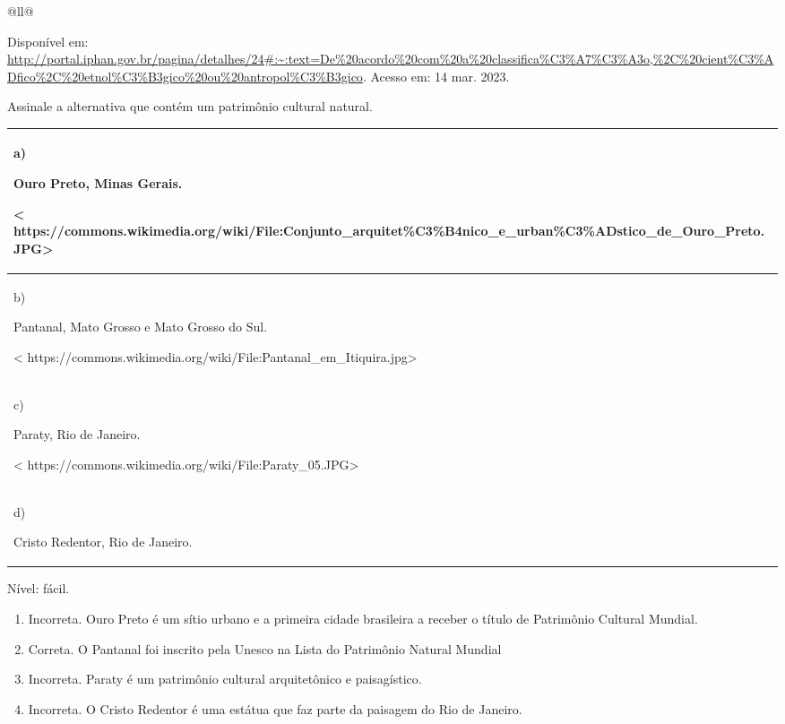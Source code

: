 \begin{itemize}
\begin{itemize}
\begin{escolha}[]{@{}ll@{}}
{{{{{{{{Disponível em:
\url{http://portal.iphan.gov.br/pagina/detalhes/24\#:~:text=De\%20acordo\%20com\%20a\%20classifica\%C3\%A7\%C3\%A3o,\%2C\%20cient\%C3\%ADfico\%2C\%20etnol\%C3\%B3gico\%20ou\%20antropol\%C3\%B3gico}.
Acesso em: 14 mar. 2023.

Assinale a alternativa que contém um patrimônio cultural natural.

\begin{longtable}[]{@{}l@{}}
\toprule
\begin{minipage}[b]{0.97\columnwidth}\raggedright\strut
a)

Ouro Preto, Minas Gerais.

\textless{}
https://commons.wikimedia.org/wiki/File:Conjunto\_arquitet\%C3\%B4nico\_e\_urban\%C3\%ADstico\_de\_Ouro\_Preto.JPG\textgreater{}\strut
\end{minipage}\tabularnewline
\midrule
\endhead
\begin{minipage}[t]{0.97\columnwidth}\raggedright\strut
b)

Pantanal, Mato Grosso e Mato Grosso do Sul.

\textless{}
https://commons.wikimedia.org/wiki/File:Pantanal\_em\_Itiquira.jpg\textgreater{}\strut
\end{minipage}\tabularnewline
\begin{minipage}[t]{0.97\columnwidth}\raggedright\strut
c)

Paraty, Rio de Janeiro.

\textless{}
https://commons.wikimedia.org/wiki/File:Paraty\_05.JPG\textgreater{}\strut
\end{minipage}\tabularnewline
\begin{minipage}[t]{0.97\columnwidth}\raggedright\strut
d)

Cristo Redentor, Rio de Janeiro.\strut
\end{minipage}\tabularnewline
\bottomrule
\end{longtable}

Nível: fácil.

\begin{enumerate}
\def\labelenumi{\alph{enumi})}
\item
  Incorreta. Ouro Preto é um sítio urbano e a primeira cidade brasileira
  a receber o título de Patrimônio Cultural Mundial.
\item
  Correta. O Pantanal foi inscrito pela Unesco na Lista do Patrimônio
  Natural Mundial
\item
  Incorreta. Paraty é um patrimônio cultural arquitetônico e
  paisagístico.
\item
  Incorreta. O Cristo Redentor é uma estátua que faz parte da paisagem
  do Rio de Janeiro.
\end{enumerate}

}}}}}}}}
\end{escolha}
\end{itemize}
\end{itemize}
